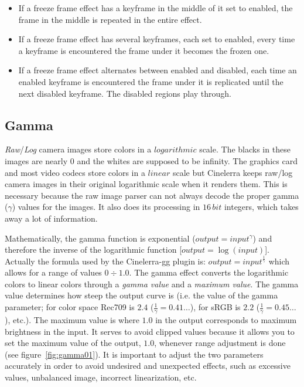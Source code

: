 \begin{itemize}
    \item If a freeze frame effect has a keyframe in the middle of it set to enabled, the frame in the middle is repeated in the entire effect.
    \item If a freeze frame effect has several keyframes, each set to enabled, every time a keyframe is encountered the frame under it becomes the frozen one.
    \item If a freeze frame effect alternates between enabled and disabled, each time an enabled keyframe is encountered the frame under it is replicated until the next disabled keyframe. The disabled regions play through.
\end{itemize}

\subsection{Gamma}%
\label{sub:gamma}

\textit{Raw}/\textit{Log} camera images store colors in a $logarithmic$ scale. The blacks in these images are nearly $0$ and the whites are supposed to be infinity. The graphics card and most video codecs store colors in a $linear$ scale but Cinelerra keeps raw/log camera images in their original logarithmic scale when it renders them. This is necessary because the raw image parser can not always decode the proper gamma ($\gamma$) values for the images. It also does its processing in $16\,bit$ integers, which takes away a lot of information.

Mathematically, the gamma function is exponential ($output = input^{\gamma}$) and therefore the inverse of the logarithmic function [$output = \log(input)$]. Actually the formula used by the Cinelerra-gg plugin is: $output = input^{\frac{1}{\gamma}}$ which allows for a range of values $0 \div 1.0$. The gamma effect converts the logarithmic colors to linear colors through a \textit{gamma value} and a \textit{maximum value}. The gamma value determines how steep the output curve is (i.e. the value of the gamma parameter; for color space Rec709 is $2.4$ ($\frac{1}{\gamma} =0.41\dots$), for sRGB is $2.2$ ($\frac{1}{\gamma} =0.45\dots$), etc.). The maximum value is where $1.0$ in the output corresponds to maximum brightness in the input. It serves to avoid clipped values because it allows you to set the maximum value of the output, $1.0$, whenever range adjustment is done (see figure~\ref{fig:gamma01}). It is important to adjust the two parameters accurately in order to avoid undesired and unexpected effects, such as excessive values, unbalanced image, incorrect linearization, etc.


